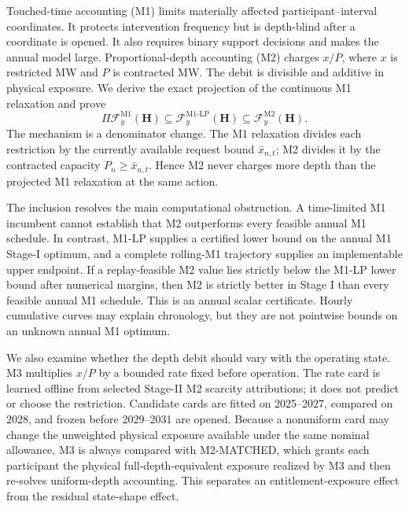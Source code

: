 \documentclass[10pt,journal]{IEEEtran}
\newcommand{\Mone}{\ensuremath{\mathrm{M1}}}
\newcommand{\MoneLP}{\ensuremath{\mathrm{M1\text{-}LP}}}
\newcommand{\Mtwo}{\ensuremath{\mathrm{M2}}}
\begin{document}
Touched-time accounting (M1) limits materially affected participant--interval coordinates. It protects intervention frequency but is depth-blind after a coordinate is opened. It also requires binary support decisions and makes the annual model large. Proportional-depth accounting (M2) charges $x/P$, where $x$ is restricted MW and $P$ is contracted MW. The debit is divisible and additive in physical exposure. We derive the exact projection of the continuous M1 relaxation and prove
\begin{equation}
\Pi\mathcal F_y^{\Mone}(\bm H)
\subseteq
\mathcal F_y^{\MoneLP}(\bm H)
\subseteq
\mathcal F_y^{\Mtwo}(\bm H).
\label{eq:intro_hierarchy}
\end{equation}
The mechanism is a denominator change. The M1 relaxation divides each restriction by the currently available request bound $\bar x_{n,t}$; M2 divides it by the contracted capacity $P_n\geq \bar x_{n,t}$. Hence M2 never charges more depth than the projected M1 relaxation at the same action.

The inclusion resolves the main computational obstruction. A time-limited M1 incumbent cannot establish that M2 outperforms every feasible annual M1 schedule. In contrast, M1-LP supplies a certified lower bound on the annual M1 Stage-I optimum, and a complete rolling-M1 trajectory supplies an implementable upper endpoint. If a replay-feasible M2 value lies strictly below the M1-LP lower bound after numerical margins, then M2 is strictly better in Stage I than every feasible annual M1 schedule. This is an annual scalar certificate. Hourly cumulative curves may explain chronology, but they are not pointwise bounds on an unknown annual M1 optimum.

We also examine whether the depth debit should vary with the operating state. M3 multiplies $x/P$ by a bounded rate fixed before operation. The rate card is learned offline from selected Stage-II M2 scarcity attributions; it does not predict or choose the restriction. Candidate cards are fitted on 2025--2027, compared on 2028, and frozen before 2029--2031 are opened. Because a nonuniform card may change the unweighted physical exposure available under the same nominal allowance, M3 is always compared with M2-MATCHED, which grants each participant the physical full-depth-equivalent exposure realized by M3 and then re-solves uniform-depth accounting. This separates an entitlement-exposure effect from the residual state-shape effect.
\end{document}
